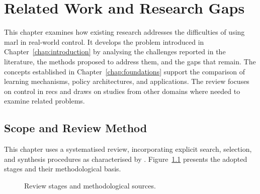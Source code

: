 \chapter{Related Work and Research Gaps}
\label{chap:related-work}
\begingroup
{}
\raggedbottom
\newcommand{\chthreeoutline}[1]{\par\noindent{\itshape\interlinepenalty=10000 #1\par}}

This chapter examines how existing research addresses the difficulties of using \gls{marl} in real-world control. It develops the problem introduced in Chapter~\ref{chap:introduction} by analysing the challenges reported in the literature, the methods proposed to address them, and the gaps that remain. The concepts established in Chapter~\ref{chap:foundations} support the comparison of learning mechanisms, policy architectures, and applications. The review focuses on control in \glspl{rec} and draws on studies from other domains where needed to examine related problems.

\FloatBarrier
\section{Scope and Review Method}
\label{sec:ch3-review-method}
\label{sec:ch2-method}

This chapter uses a systematised review, incorporating explicit search, selection, and synthesis procedures as characterised by \textcite{grant2009typology}. Figure~\ref{fig:ch3-review-protocol} presents the adopted stages and their methodological basis.

\begin{figure}[!htbp]
\centering

\caption{Review stages and methodological sources.}
\label{fig:ch3-review-protocol}
\end{figure}

